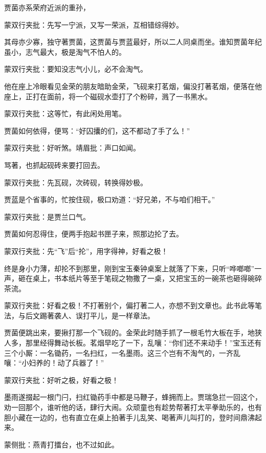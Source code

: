 \begin{parag}


    贾菌亦系荣府近派的重孙，\begin{note}蒙双行夹批：先写一宁派，又写一荣派，互相错综得妙。\end{note}其母亦少寡，独守著贾菌，这贾菌与贾蓝最好，所以二人同桌而坐。谁知贾菌年纪虽小，志气最大，极是淘气不怕人的。\begin{note}蒙双行夹批：要知没志气小儿，必不会淘气。\end{note}他在座上冷眼看见金荣的朋友暗助金荣，飞砚来打茗烟，偏没打著茗烟，便落在他座上，正打在面前，将一个磁砚水壶打了个粉碎，溅了一书黑水。\begin{note}蒙双行夹批：这等忙，有此闲处用笔。\end{note}贾菌如何依得，便骂：“好囚攮的们，这不都动了手了么！”\begin{note}蒙双行夹批：好听煞。靖眉批：声口如闻。\end{note}骂著，也抓起砚砖来要打回去。\begin{note}蒙双行夹批：先瓦砚，次砖砚，转换得妙极。\end{note}贾蓝是个省事的，忙按住砚，极口劝道：“好兄弟，不与咱们相干。”\begin{note}蒙双行夹批：是贾兰口气。\end{note}贾菌如何忍得住，便两手抱起书匣子来，照那边抡了去。\begin{note}蒙双行夹批：先“飞”后“抡”，用字得神，好看之极！\end{note}终是身小力薄，却抡不到那里，刚到宝玉秦钟桌案上就落了下来，只听“哗啷啷”一声，砸在桌上，书本纸片等至于笔砚之物撒了一桌，又把宝玉的一碗茶也砸得碗碎茶流。\begin{note}蒙双行夹批：好看之极！不打著别个，偏打著二人，亦想不到文章也。此书此等笔法，与后文踢著袭人、误打平儿，是一样章法。\end{note}贾菌便跳出来，要揪打那一个飞砚的。金荣此时随手抓了一根毛竹大板在手，地狭人多，那里经得舞动长板。茗烟早吃了一下，乱嚷：“你们还不来动手！”宝玉还有三个小厮：一名锄药，一名扫红，一名墨雨。这三个岂有不淘气的，一齐乱嚷：“小妇养的！动了兵器了！”\begin{note}蒙双行夹批：好听之极，好看之极！\end{note}墨雨遂掇起一根门闩，扫红锄药手中都是马鞭子，蜂拥而上。贾瑞急拦一回这个，劝一回那个，谁听他的话，肆行大闹。众顽童也有趁势帮著打太平拳助乐的，也有胆小藏在一边的，也有直立在桌上拍著手儿乱笑、喝著声儿叫打的，登时间鼎沸起来。\begin{note}蒙侧批：燕青打擂台，也不过如此。\end{note}
\end{parag}


